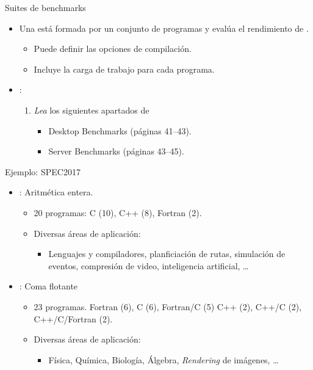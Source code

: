 \begin{frame}[t]{Suites de benchmarks}
\begin{itemize}
  \item Una  está formada por un conjunto
        de programas y evalúa el rendimiento de .
    \begin{itemize}
      \item Puede definir las opciones de compilación.
      \item Incluye la carga de trabajo para cada programa.
    \end{itemize}

  \item {}:
    \begin{enumerate}
      \item \emph{Lea} los siguientes apartados de 

        \bibhennessy
        \begin{itemize}
          \item Desktop Benchmarks (páginas 41--43).
          \item Server Benchmarks (páginas 43--45).
        \end{itemize}
    \end{enumerate}
\end{itemize}
\end{frame}

\begin{frame}[t]{Ejemplo: SPEC2017}
\begin{itemize}
  \item {}: Aritmética entera.
    \begin{itemize}
      \item 20 programas: C (10), C++ (8), Fortran (2).
      \item Diversas áreas de aplicación:
        \begin{itemize}
          \item Lenguajes y compiladores, 
                planficiación de rutas,
                simulación de eventos,
                compresión de video,
                inteligencia artificial, \ldots
        \end{itemize}
    \end{itemize}
  \item {}: Coma flotante
    \begin{itemize}
      \item 23 programas.
           Fortran (6),
           C (6),
           Fortran/C (5)
           C++ (2),
           C++/C (2),
           C++/C/Fortran (2).
      \item Diversas áreas de aplicación:
        \begin{itemize}
          \item Física, Química, Biología, Álgebra, \emph{Rendering} de imágenes,
                \ldots
        \end{itemize}
    \end{itemize}
\end{itemize}
\end{frame}
